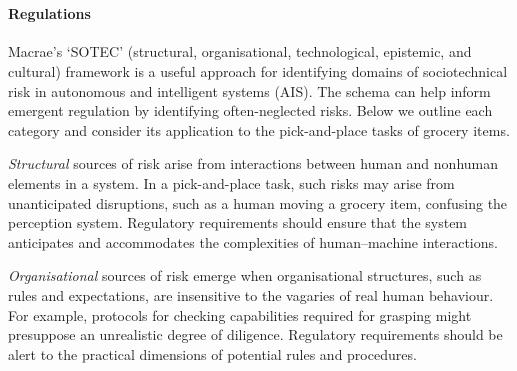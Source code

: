 \documentclass[lettersize,journal]{IEEEtran}
\begin{document}
\\

\paragraph{Regulations}\label{regulation}

Macrae’s \cite{Macrae2022} ‘SOTEC’ (structural, organisational, technological, epistemic, and cultural) framework is a useful approach for identifying domains of sociotechnical risk in autonomous and intelligent systems (AIS). The schema can help inform emergent regulation by identifying often-neglected risks. Below we outline each category and consider its application to the pick-and-place tasks of grocery items.

\emph{Structural} sources of risk arise from interactions between human and nonhuman elements in a system.
In a pick-and-place task, such risks may arise from unanticipated disruptions, such as a human moving a grocery item, confusing the perception system. Regulatory requirements should ensure that the system anticipates and accommodates the complexities of human–machine interactions.

\emph{Organisational} sources of risk emerge when organisational structures, such as rules and expectations, are insensitive to the vagaries of real human behaviour. For example, protocols for checking capabilities required for grasping might presuppose an unrealistic degree of diligence. Regulatory requirements should be alert to the practical dimensions of potential rules and procedures.
\end{document}
